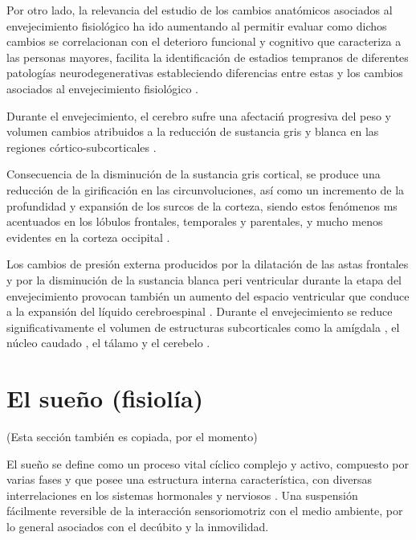 Por otro lado, la relevancia del estudio de los cambios anat\'omicos asociados al envejecimiento 
fisiol\'ogico ha ido aumentando al permitir evaluar como dichos cambios se correlacionan con 
el deterioro funcional y cognitivo que caracteriza a las personas mayores, facilita la 
identificaci\'on de estadios tempranos de diferentes patolog\'ias neurodegenerativas estableciendo 
diferencias entre estas y los cambios asociados al envejecimiento fisiol\'ogico \cite{Hita14}.

Durante el envejecimiento, el cerebro sufre una afectaci\'n progresiva del peso \cite{Dekaban78} 
y volumen \cite{Hubbard81} cambios atribuidos a la reducci\'on de sustancia gris y blanca en
las regiones c\'ortico-subcorticales \cite{Hita14}.

Consecuencia de la disminuci\'on de la sustancia gris cortical, se produce una reducci\'on de 
la girificaci\'on en las circunvoluciones, as\'i como un incremento de la profundidad y 
expansi\'on de los surcos de la corteza, siendo estos fen\'omenos ms acentuados en los l\'obulos 
frontales, temporales y parentales, y mucho menos evidentes en la corteza occipital \cite{Raz05}.

Los cambios de presi\'on externa producidos por la dilataci\'on de las astas frontales y por la 
disminuci\'on de la sustancia blanca peri ventricular durante la etapa del envejecimiento 
provocan tambi\'en un aumento del espacio ventricular que conduce a la expansi\'on del l\'iquido 
cerebroespinal \cite{Hita14,Raz05}.
Durante el envejecimiento se reduce significativamente el volumen de estructuras subcorticales 
como la am\'igdala \cite{Allen05}, el n\'ucleo caudado \cite{Raz05}, el t\'alamo 
\cite{CarrilloMora} y el cerebelo \cite{Hita14}.


\section{El sue\~no (fisiol\'ia)}

(Esta secci\'on tambi\'en es copiada, por el momento)

El sue\~no se define como un proceso vital c\'iclico complejo y activo, compuesto por varias 
fases y que posee una estructura interna caracter\'istica, con diversas interrelaciones en los 
sistemas hormonales y nerviosos \cite{FernandezConde07}. Una suspensi\'on f\'acilmente reversible 
de la interacci\'on sensoriomotriz con el medio ambiente, por lo general asociados con el 
dec\'ubito y la inmovilidad.

